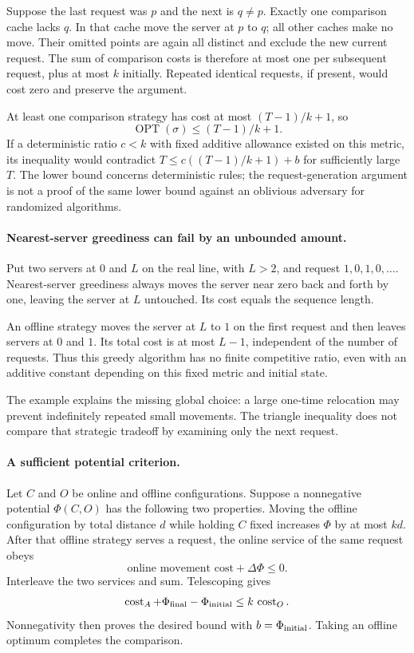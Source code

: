 \documentclass[11pt]{article}
\begin{document}
Suppose the last request was $p$ and the next is $q\ne p$. Exactly one comparison cache lacks $q$. In that cache move the server at $p$ to $q$; all other caches make no move. Their omitted points are again all distinct and exclude the new current request. The sum of comparison costs is therefore at most one per subsequent request, plus at most $k$ initially. Repeated identical requests, if present, would cost zero and preserve the argument.

At least one comparison strategy has cost at most $(T-1)/k+1$, so
\[
 \operatorname{OPT}(\sigma)\le(T-1)/k+1.
\]
If a deterministic ratio $c<k$ with fixed additive allowance existed on this metric, its inequality would contradict $T\le c((T-1)/k+1)+b$ for sufficiently large $T$. The lower bound concerns deterministic rules; the request-generation argument is not a proof of the same lower bound against an oblivious adversary for randomized algorithms.

\paragraph{Nearest-server greediness can fail by an unbounded amount.}
Put two servers at $0$ and $L$ on the real line, with $L>2$, and request $1,0,1,0,\ldots$. Nearest-server greediness always moves the server near zero back and forth by one, leaving the server at $L$ untouched. Its cost equals the sequence length.

An offline strategy moves the server at $L$ to $1$ on the first request and then leaves servers at $0$ and $1$. Its total cost is at most $L-1$, independent of the number of requests. Thus this greedy algorithm has no finite competitive ratio, even with an additive constant depending on this fixed metric and initial state.

The example explains the missing global choice: a large one-time relocation may prevent indefinitely repeated small movements. The triangle inequality does not compare that strategic tradeoff by examining only the next request.

\paragraph{A sufficient potential criterion.}
Let $C$ and $O$ be online and offline configurations. Suppose a nonnegative potential $\Phi(C,O)$ has the following two properties. Moving the offline configuration by total distance $d$ while holding $C$ fixed increases $\Phi$ by at most $kd$. After that offline strategy serves a request, the online service of the same request obeys
\[
 \text{online movement cost}+\Delta\Phi\le0.
 \tag{262.3}
\]
Interleave the two services and sum. Telescoping gives
\[
 \operatorname{cost}_A+\Phi_{\rm final}-\Phi_{\rm initial}
       \le k\,\operatorname{cost}_O.
\]
Nonnegativity then proves the desired bound with $b=\Phi_{\rm initial}$. Taking an offline optimum completes the comparison.
\end{document}
